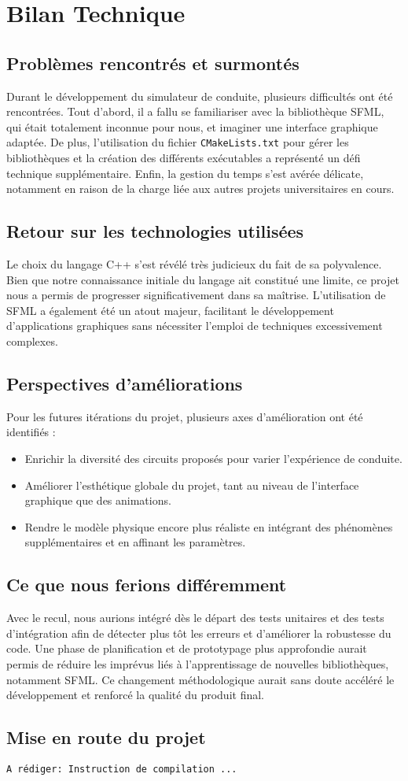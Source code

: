 \section{Bilan Technique}

\subsection{Problèmes rencontrés et surmontés}
Durant le développement du simulateur de conduite, plusieurs difficultés ont été rencontrées.
Tout d'abord, il a fallu se familiariser avec la bibliothèque SFML, qui était totalement inconnue pour nous, et imaginer une interface graphique adaptée.
De plus, l'utilisation du fichier \texttt{CMakeLists.txt} pour gérer les bibliothèques et la création des différents exécutables a représenté un défi technique supplémentaire.
Enfin, la gestion du temps s'est avérée délicate, notamment en raison de la charge liée aux autres projets universitaires en cours.

\subsection{Retour sur les technologies utilisées}
Le choix du langage C++ s'est révélé très judicieux du fait de sa polyvalence.
Bien que notre connaissance initiale du langage ait constitué une limite, ce projet nous a permis de progresser significativement dans sa maîtrise.
L'utilisation de SFML a également été un atout majeur, facilitant le développement d'applications graphiques sans nécessiter l'emploi de techniques excessivement complexes.

\subsection{Perspectives d'améliorations}
Pour les futures itérations du projet, plusieurs axes d'amélioration ont été identifiés :
\begin{itemize}
    \item Enrichir la diversité des circuits proposés pour varier l'expérience de conduite.
    \item Améliorer l'esthétique globale du projet, tant au niveau de l'interface graphique que des animations.
    \item Rendre le modèle physique encore plus réaliste en intégrant des phénomènes supplémentaires et en affinant les paramètres.
\end{itemize}

\subsection{Ce que nous ferions différemment}
Avec le recul, nous aurions intégré dès le départ des tests unitaires et des tests d'intégration afin de détecter plus tôt les erreurs et d'améliorer la robustesse du code.
Une phase de planification et de prototypage plus approfondie aurait permis de réduire les imprévus liés à l'apprentissage de nouvelles bibliothèques, notamment SFML.
Ce changement méthodologique aurait sans doute accéléré le développement et renforcé la qualité du produit final.

\subsection{Mise en route du projet}
\texttt{A rédiger: Instruction de compilation ...}